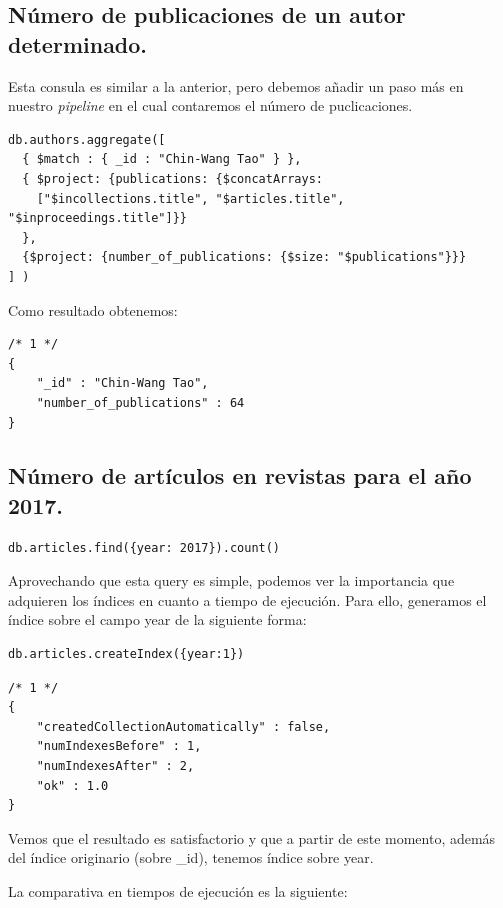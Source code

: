 \subsection{Número de publicaciones de un autor determinado.}

Esta consula es similar a la anterior, pero debemos añadir un paso más en nuestro \textit{pipeline} en el cual contaremos el número de puclicaciones.

\begin{verbatim}
db.authors.aggregate([
  { $match : { _id : "Chin-Wang Tao" } }, 
  { $project: {publications: {$concatArrays: 
    ["$incollections.title", "$articles.title", "$inproceedings.title"]}}
  },
  {$project: {number_of_publications: {$size: "$publications"}}}
] )
\end{verbatim}


Como resultado obtenemos:

\begin{verbatim}
/* 1 */
{
    "_id" : "Chin-Wang Tao",
    "number_of_publications" : 64
}
\end{verbatim}

\subsection{Número de artículos en revistas para el año 2017.}

\begin{verbatim}
db.articles.find({year: 2017}).count()
\end{verbatim}

Aprovechando que esta query es simple, podemos ver la importancia que adquieren los índices en cuanto a tiempo de ejecución. Para ello, generamos el índice sobre el campo year de la siguiente forma:

\begin{verbatim}
db.articles.createIndex({year:1})
\end{verbatim}


\begin{verbatim}
/* 1 */
{
    "createdCollectionAutomatically" : false,
    "numIndexesBefore" : 1,
    "numIndexesAfter" : 2,
    "ok" : 1.0
}
\end{verbatim}

Vemos que el resultado es satisfactorio y que a partir de este momento, además del índice originario (sobre _id), tenemos índice sobre year.

La comparativa en tiempos de ejecución es la siguiente:

